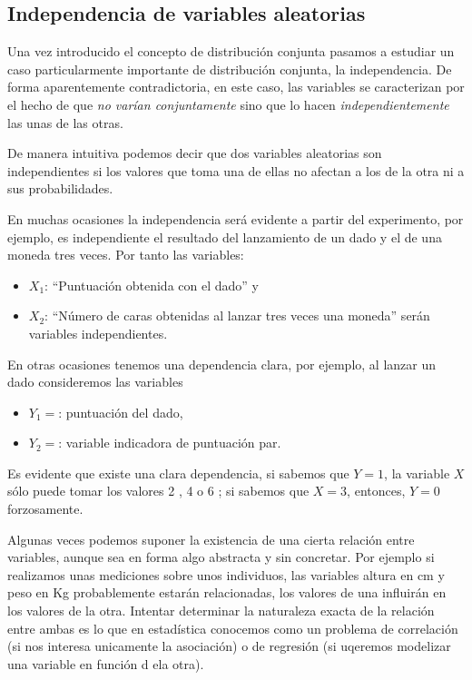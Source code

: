 \documentclass[
]{article}
\providecommand{\tightlist}{%
  \setlength{\itemsep}{0pt}\setlength{\parskip}{0pt}}
\begin{document}
\subsection{Independencia de variables aleatorias}\label{independencia-de-variables-aleatorias}

Una vez introducido el concepto de distribución conjunta pasamos a estudiar un caso particularmente importante de distribución conjunta, la independencia.
De forma aparentemente contradictoria, en este caso, las variables se caracterizan por el hecho de que \emph{no varían conjuntamente} sino que lo hacen \emph{independientemente} las unas de las otras.

De manera intuitiva podemos decir que dos variables aleatorias son independientes si los valores que toma una de ellas no afectan a los de la otra ni a sus probabilidades.

En muchas ocasiones la independencia será evidente a partir del experimento, por ejemplo, es independiente el resultado del lanzamiento de un dado y el de una moneda tres veces. Por tanto las variables:

\begin{itemize}
\tightlist
\item
  \(X_1\): ``Puntuación obtenida con el dado'' y
\item
  \(X_2\): ``Número de caras obtenidas al lanzar tres veces una moneda'' serán variables independientes.
\end{itemize}

En otras ocasiones tenemos una dependencia clara, por ejemplo, al lanzar un dado consideremos las variables

\begin{itemize}
\tightlist
\item
  \(Y_1=\): puntuación del dado,
\item
  \(Y_2=\): variable indicadora de puntuación par.
\end{itemize}

Es evidente que existe una clara dependencia, si sabemos que \(Y=1\), la variable \(X\) sólo puede tomar los valores 2 , 4 o 6 ; si sabemos que \(X=3\), entonces, \(Y=0\) forzosamente.

Algunas veces podemos suponer la existencia de una cierta relación entre variables, aunque sea en forma algo abstracta y sin concretar. Por ejemplo si realizamos unas mediciones sobre unos individuos, las variables altura en cm y peso en Kg probablemente estarán relacionadas, los valores de una influirán en los valores de la otra. Intentar determinar la naturaleza exacta de la relación entre ambas es lo que en estadística conocemos como un problema de correlación (si nos interesa unicamente la asociación) o de regresión (si uqeremos modelizar una variable en función d ela otra).
\end{document}
